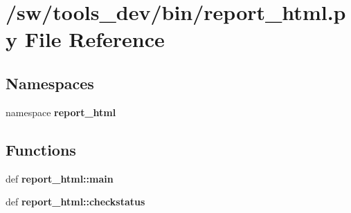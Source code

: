 \section{/sw/tools\_\-dev/bin/report\_\-html.py File Reference}
\label{report__html_8py}
\subsection*{Namespaces}
\begin{CompactItemize}
\item 
namespace {\bf report\_\-html}
\end{CompactItemize}
\subsection*{Functions}
\begin{CompactItemize}
\item 
def {\bf report\_\-html::main}
\item 
def {\bf report\_\-html::checkstatus}
\end{CompactItemize}
